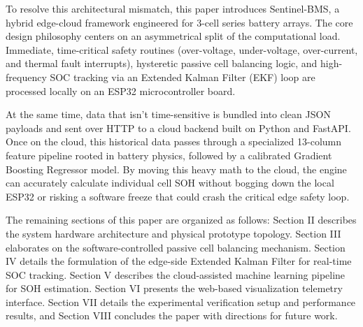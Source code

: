 \documentclass[conference]{IEEEtran}
\begin{document}
To resolve this architectural mismatch, this paper introduces Sentinel-BMS, a hybrid edge-cloud framework engineered for 3-cell series battery arrays. The core design philosophy centers on an asymmetrical split of the computational load. Immediate, time-critical safety routines (over-voltage, under-voltage, over-current, and thermal fault interrupts), hysteretic passive cell balancing logic, and high-frequency SOC tracking via an Extended Kalman Filter (EKF) loop are processed locally on an ESP32 microcontroller board.

At the same time, data that isn't time-sensitive is bundled into clean JSON payloads and sent over HTTP to a cloud backend built on Python and FastAPI. Once on the cloud, this historical data passes through a specialized 13-column feature pipeline rooted in battery physics, followed by a calibrated Gradient Boosting Regressor model. By moving this heavy math to the cloud, the engine can accurately calculate individual cell SOH without bogging down the local ESP32 or risking a software freeze that could crash the critical edge safety loop.

The remaining sections of this paper are organized as follows: Section II describes the system hardware architecture and physical prototype topology. Section III elaborates on the software-controlled passive cell balancing mechanism. Section IV details the formulation of the edge-side Extended Kalman Filter for real-time SOC tracking. Section V describes the cloud-assisted machine learning pipeline for SOH estimation. Section VI presents the web-based visualization telemetry interface. Section VII details the experimental verification setup and performance results, and Section VIII concludes the paper with directions for future work.
\end{document}
